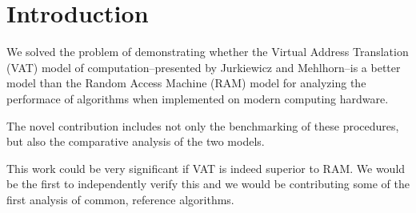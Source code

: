 \section{Introduction}
  
  We solved the problem of demonstrating whether the Virtual Address Translation
  (VAT) model of computation--presented by Jurkiewicz and Mehlhorn--is a 
  better model than the Random Access Machine (RAM) model for analyzing the 
  performace of algorithms when implemented on modern computing hardware.
  
  The novel contribution includes not only the benchmarking of these procedures,
  but also the comparative analysis of the two models.

  This work could be very significant if VAT is indeed superior to RAM. We would
  be the first to independently verify this and we would be contributing some of
  the first analysis of common, reference algorithms.
